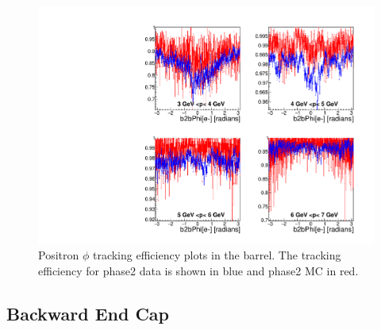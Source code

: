 \documentclass[a4paper,11pt,twosided,final,german,openbib,pdftex,listof=totoc,bibliography=totoc]{scrbook}
\begin{document}
\begin{figure}[!htbp]
	\centering
	\includegraphics[width=\textwidth]{Plots/master/xPMPhiepBarrel}
	\caption[Momentum $\phi$ Positron Barrel Efficiency Phase2]{Positron $\phi$ tracking efficiency plots in the barrel. The tracking efficiency for phase2 data is shown in blue and phase2 MC in red.}
		\label{plt:xPMPhiepBarrel}
\end{figure}

\newpage
\subsection{Backward End Cap}
\label{sec:MEC}
\end{document}
